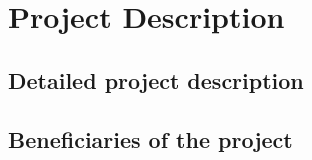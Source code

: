\chapter{Project Description}
\section{Detailed project description}





\section{Beneficiaries of the project}





